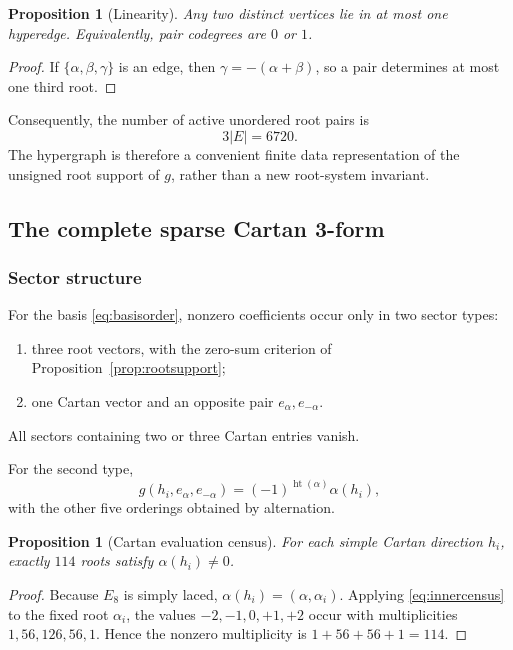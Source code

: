 \documentclass[11pt]{article}
\newtheorem{proposition}[theorem]{Proposition}
\theoremstyle{definition}
\theoremstyle{remark}
\begin{document}
\begin{proposition}[Linearity]\label{prop:linearity}
Any two distinct vertices lie in at most one hyperedge.  Equivalently, pair codegrees are $0$ or $1$.
\end{proposition}

\begin{proof}
If $\{\alpha,\beta,\gamma\}$ is an edge, then $\gamma=-(\alpha+\beta)$, so a pair determines at most one third root.
\end{proof}

Consequently, the number of active unordered root pairs is
\[
3|E|=6720.
\]
The hypergraph is therefore a convenient finite data representation of the unsigned root support of $g$, rather than a new root-system invariant.

\subsection{The complete sparse Cartan 3-form}\label{sec:sparse}

\subsubsection{Sector structure}

For the basis \eqref{eq:basisorder}, nonzero coefficients occur only in two sector types:
\begin{enumerate}[label=(\roman*)]
\item three root vectors, with the zero-sum criterion of Proposition~\ref{prop:rootsupport};
\item one Cartan vector and an opposite pair $e_\alpha,e_{-\alpha}$.
\end{enumerate}
All sectors containing two or three Cartan entries vanish.

For the second type,
\begin{equation}\label{eq:hrrformula}
g(h_i,e_\alpha,e_{-\alpha})
=(-1)^{\operatorname{ht}(\alpha)}\alpha(h_i),
\end{equation}
with the other five orderings obtained by alternation.

\begin{proposition}[Cartan evaluation census]\label{prop:114}
For each simple Cartan direction $h_i$, exactly $114$ roots satisfy $\alpha(h_i)\neq0$.
\end{proposition}

\begin{proof}
Because $E_8$ is simply laced, $\alpha(h_i)=(\alpha,\alpha_i)$.  Applying \eqref{eq:innercensus} to the fixed root $\alpha_i$, the values $-2,-1,0,+1,+2$ occur with multiplicities $1,56,126,56,1$.  Hence the nonzero multiplicity is $1+56+56+1=114$.
\end{proof}
\end{document}
